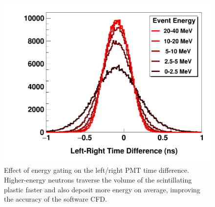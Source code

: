 
\begin{figure}
    \includegraphics[scale=0.3]{figures/LRDifferenceByEnergy.png}
    \caption[Effect of energy gating on left/right PMT time difference]
    {
    Effect of energy gating on the left/right PMT time difference. Higher-energy neutrons traverse
    the volume of the scintillating plastic faster and also deposit more energy on average,
    improving the accuracy of the software CFD.
    }
    \label{LRTimeDifferenceByEnergy}
\end{figure}

